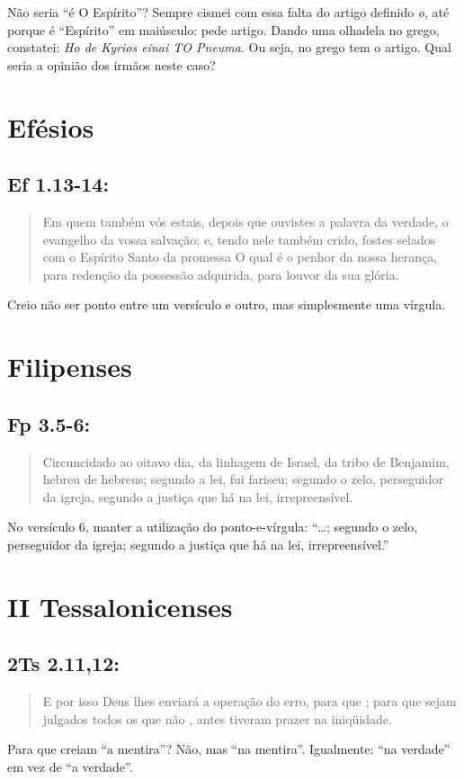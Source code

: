 Não seria ``é O Espírito''? Sempre cismei com essa falta do artigo definido \emph{o}, até porque é ``Espírito'' em maiúsculo: pede artigo. Dando uma olhadela no grego, constatei: \textit{Ho de Kyrios einai TO Pneuma}. Ou seja, no grego tem o artigo. Qual seria a opinião dos irmãos neste caso?

\section{Efésios}
\subsection*{Ef 1.13-14:}
\begin{quote}
    \small
Em quem também vós estais, depois que  ouvistes a palavra da verdade, o evangelho da vossa salvação; e,  tendo nele também crido, fostes selados com o Espírito Santo da
promessa O qual é o penhor da nossa  herança, para redenção da possessão adquirida, para louvor da sua  glória.
\end{quote}

Creio não ser ponto entre um versículo e outro, mas simplesmente uma vírgula.

\section{Filipenses}
\subsection*{Fp 3.5-6:}
\begin{quote}
    \small
Circuncidado ao oitavo dia, da linhagem de Israel, da tribo de Benjamim, hebreu de hebreus; segundo a lei, fui fariseu; segundo o zelo, perseguidor da  igreja, segundo a justiça que há na lei, irrepreensível.
\end{quote}

No versículo 6, manter a utilização do ponto-e-vírgula: ``\ldots{}; segundo o zelo, perseguidor da igreja; segundo a justiça que há na lei, irrepreensível.''

\section{II Tessalonicenses}
\subsection*{2Ts 2.11,12:}
\begin{quote}
    \small
E por isso Deus lhes enviará a
operação do erro, para que ; para que sejam julgados todos os que não , antes tiveram prazer na iniqüidade.
\end{quote}
Para que creiam ``a mentira''? Não, mas ``na mentira''. Igualmente: ``na verdade'' em vez de ``a verdade''.

